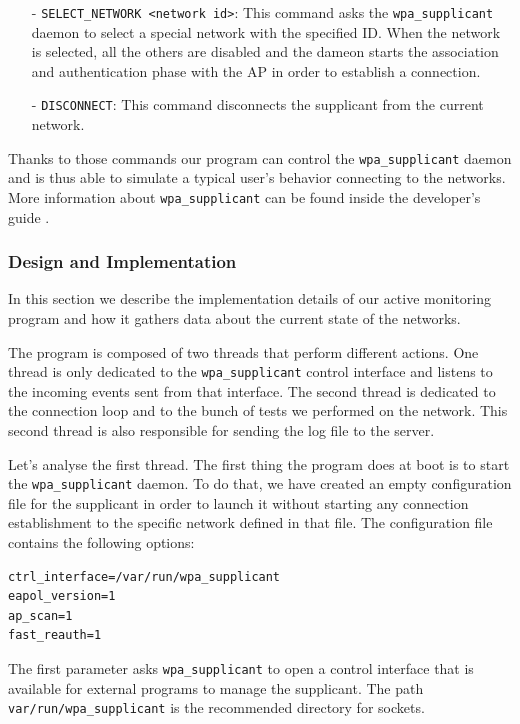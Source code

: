 \begin{itemize}
	\item[-] \texttt{SELECT\_NETWORK <network id>}: This command asks the \texttt{wpa\_supplicant} daemon to select a special network with the specified ID. When the network is selected, all the others are disabled and the dameon starts the association and authentication phase with the AP in order to establish a connection.

	\item[-] \texttt{DISCONNECT}: This command disconnects the supplicant from the current network.
\end{itemize}

Thanks to those commands our program can control the \texttt{wpa\_supplicant} daemon and is thus able to simulate a typical user's behavior connecting to the networks. More information about \texttt{wpa\_supplicant} can be found inside the developer's guide \cite{wpa-supplicant-devel}.


\subsubsection{Design and Implementation}
In this section we describe the implementation details of our active monitoring program and how it gathers data about the current state of the networks.

The program is composed of two threads that perform different actions. One thread is only dedicated to the \texttt{wpa\_supplicant} control interface and listens to the incoming events sent from that interface. The second thread is dedicated to the connection loop and to the bunch of tests we performed on the network. This second thread is also responsible for sending the log file to the server.

Let's analyse the first thread. The first thing the program does at boot is to start the \texttt{wpa\_supplicant} daemon. To do that, we have created an empty configuration file for the supplicant in order to launch it without starting any connection establishment to the specific network defined in that file. The configuration file contains the following options:\\

\begin{lstlisting}[frame=single,breaklines=true,caption={\texttt{wpa\_supplicant.conf}}]
ctrl_interface=/var/run/wpa_supplicant
eapol_version=1
ap_scan=1
fast_reauth=1
\end{lstlisting}

\par The first parameter asks \texttt{wpa\_supplicant} to open a control interface that is available for external programs to manage the supplicant. The path \texttt{var/run/wpa\_supplicant} is the recommended directory for sockets. 

